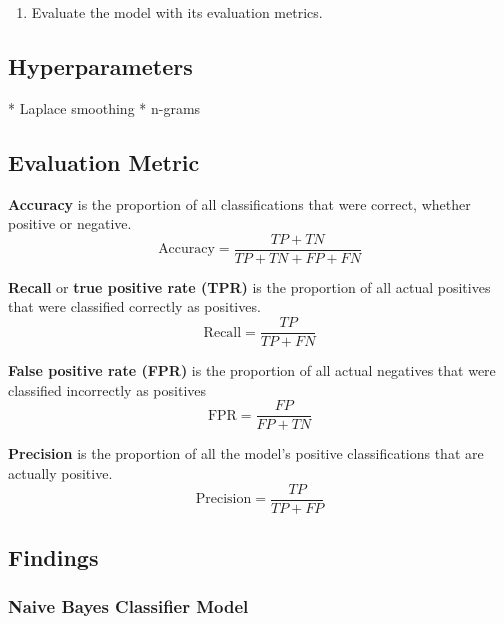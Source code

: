 \begin{enumerate}
    \item Evaluate the model with its evaluation metrics.
\end{enumerate}



\subsection{Hyperparameters}

* Laplace smoothing
* n-grams




\subsection{Evaluation Metric \cite{google_accuracy}}

\textbf{Accuracy} is the proportion of all classifications that were correct, whether positive or negative.
\begin{equation}
    \text{Accuracy} = \frac{TP + TN}{TP + TN + FP + FN}
\end{equation}

\textbf{Recall} or \textbf{true positive rate (TPR)} is the proportion of all actual positives that were classified correctly as positives.
\begin{equation}
    \text{Recall} = \frac{TP}{TP + FN}
\end{equation}

\textbf{False positive rate (FPR)} is the proportion of all actual negatives that were classified incorrectly as positives
\begin{equation}
    \text{FPR} = \frac{FP}{FP + TN}
\end{equation}

\textbf{Precision} is the proportion of all the model's positive classifications that are actually positive.
\begin{equation}
    \text{Precision} = \frac{TP}{TP + FP}
\end{equation}




\subsection{Findings}

\subsubsection{Naive Bayes Classifier Model}



